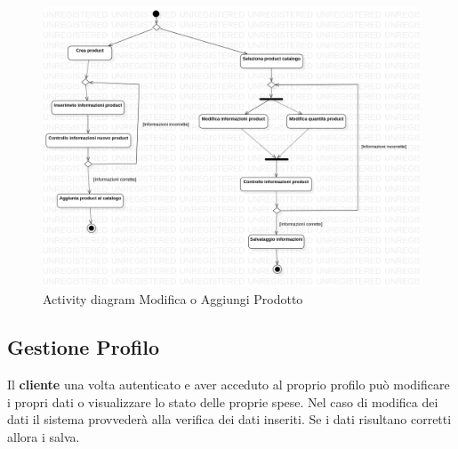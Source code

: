 \documentclass[12pt, a4paper]{report}
\begin{document}
\begin{figure}[h]
  \centering
  \includegraphics[width=\textwidth]{Use Case Model!Gestione prodotti!ActivityGestioneProdotti!ActivityDiagramGestioneProdotti_10.png}
  \caption{Activity diagram Modifica o Aggiungi Prodotto}
\end{figure}

\newpage

\subsection{Gestione Profilo}

Il \textbf{cliente} una volta autenticato e aver acceduto al proprio profilo
può modificare i propri dati o visualizzare lo stato delle proprie spese. Nel
caso di modifica dei dati il sistema provvederà alla verifica dei dati
inseriti. Se i dati risultano corretti allora i salva.
\end{document}
